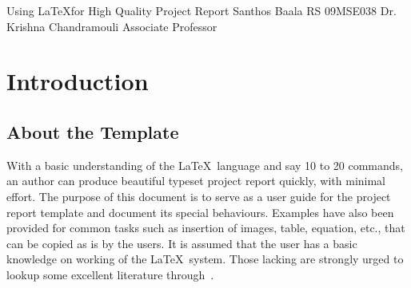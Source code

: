 \documentclass{vitmsprojectreport}
\begin{document}

\maketitlepage%
{Using \LaTeX for High Quality Project Report}%
{Santhos Baala RS}%
{09MSE038}%
{Dr. Krishna Chandramouli}%
{Associate Professor}%

\makedeclarationpage%

\makebonafidepage%

\makeackpage%


\tableofcontents  %
\clearpage
\listoffigures    %
\clearpage
\listoftables     %
\clearpage

\setcounter{page}{1}


\chapter{Introduction}

\section{About the Template}
With a basic understanding of the \LaTeX\ language and say 10 to 20 commands, an author can produce beautiful typeset project report quickly, with minimal effort. The purpose of this document is to serve as a user guide for the project report template and document its special behaviours. Examples have also been provided for common tasks such as insertion of images, table, equation, etc., that can be copied as is by the users. It is assumed that the user has a basic knowledge on working of the \LaTeX\ system. Those lacking are strongly urged to lookup some excellent literature through~\cite{kottwitz2011latex}. 
\end{document}
